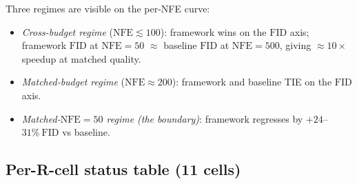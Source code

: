 \documentclass[journal,twocolumn,final]{IEEEtran}
\newcommand{\NFE}{\mathrm{NFE}}
\newcommand{\FID}{\mathrm{FID}}
\begin{document}
Three regimes are visible on the per-NFE curve:
\begin{itemize}
\item \emph{Cross-budget regime} ($\NFE \lesssim 100$): framework wins on the
$\FID$ axis; framework $\FID$ at $\NFE = 50$ $\approx$ baseline $\FID$ at
$\NFE = 500$, giving $\approx 10\times$ speedup at matched quality.
\item \emph{Matched-budget regime} ($\NFE \approx 200$): framework and
baseline TIE on the $\FID$ axis.
\item \emph{Matched-$\NFE=50$ regime (the boundary)}: framework regresses by
$+24$--$31\%~\FID$ vs baseline.
\end{itemize}

\subsection{Per-R-cell status table (11 cells)}
\end{document}
